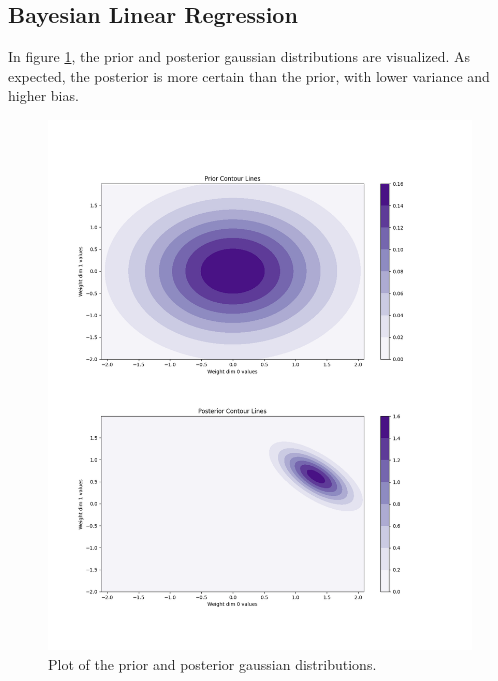 \documentclass{article}
\begin{document}
\subsection{Bayesian Linear Regression}
In figure \ref{fig:2D}, the prior and posterior gaussian distributions are visualized.
As expected, the posterior is more certain than the prior, with lower variance and higher bias.
    \begin{figure}[H]
        \includegraphics[width=\textwidth]{2D_distr.png}
        \caption{Plot of the prior and posterior gaussian distributions.}\label{fig:2D}
    \end{figure}
\end{document}
